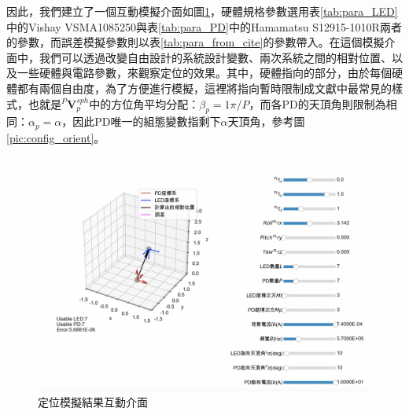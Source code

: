 





因此，我們建立了一個互動模擬介面如圖\ref{pic:result_interactive}，硬體規格參數選用表\ref{tab:para_LED}中的Vishay VSMA1085250與表\ref{tab:para_PD}中的Hamamatsu S12915-1010R兩者的參數，而誤差模擬參數則以表\ref{tab:para_from_cite}的參數帶入。在這個模擬介面中，我們可以透過改變自由設計的系統設計變數、兩次系統之間的相對位置、以及一些硬體與電路參數，來觀察定位的效果。其中，硬體指向的部分，由於每個硬體都有兩個自由度，為了方便進行模擬，這裡將指向暫時限制成文獻中最常見的樣式，也就是$^P\boldsymbol{V}_p^{sph}$中的方位角平均分配：$\beta_p = 1\pi/P$，而各PD的天頂角則限制為相同：$\alpha_p = \alpha$，因此PD唯一的組態變數指剩下$\alpha$天頂角，參考圖\ref{pic:config_orient}。



\begin{figure}[htpb]
    \centering
    \includegraphics[width=15cm]{ch4pic/result_interactive.png}
    \caption{定位模擬結果互動介面}
    \label{pic:result_interactive}
\end{figure}


